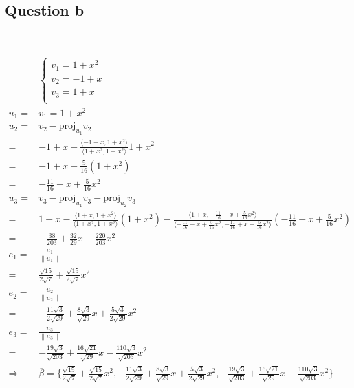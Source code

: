 \documentclass{article}
\def\proj{\text{proj}}
\begin{document}
\subsection{Question b}

~

\begin{equation*}
    \begin{split}
        &\begin{cases}
            v_1=1+x^2\\
            v_2=-1+x\\
            v_3=1+x\\
        \end{cases}\\
        u_1=&v_1=1+x^2\\
        u_2=&v_2-\proj_{u_1}v_2\\
        =&-1+x-\frac{\langle-1+x,1+x^2\rangle}{\langle1+x^2,1+x^2\rangle}1+x^2\\
        =&-1+x+\frac{5}{16}(1+x^2)\\
        =&-\frac{11}{16}+x+\frac{5}{16}x^2\\
        u_3=&v_3-\proj_{u_1}v_3-\proj_{u_2}v_3\\
        =&1+x-\frac{\langle1+x,1+x^2\rangle}{\langle1+x^2,1+x^2\rangle}(1+x^2)-\frac{\langle1+x,-\frac{11}{16}+x+\frac{5}{16}x^2\rangle}{\langle-\frac{11}{16}+x+\frac{5}{16}x^2,-\frac{11}{16}+x+\frac{5}{16}x^2\rangle}(-\frac{11}{16}+x+\frac{5}{16}x^2)\\
        =&-\frac{38}{203}+\frac{32}{29}x-\frac{220}{203}x^2\\
        e_1=&\frac{u_1}{\|u_1\|}\\
        =&\frac{\sqrt{15}}{2\sqrt{7}}+\frac{\sqrt{15}}{2\sqrt{7}}x^2\\
        e_2=&\frac{u_2}{\|u_2\|}\\
        =&-\frac{11\sqrt{3}}{2\sqrt{29}}+\frac{8\sqrt{3}}{\sqrt{29}}x+\frac{5\sqrt{3}}{2\sqrt{29}}x^2\\
        e_3=&\frac{u_3}{\|u_3\|}\\
        =&-\frac{19\sqrt{3}}{\sqrt{203}}+\frac{16\sqrt{21}}{\sqrt{29}}x-\frac{110\sqrt{3}}{\sqrt{203}}x^2\\
        \Rightarrow&\overline{\beta}=\{\frac{\sqrt{15}}{2\sqrt{7}}+\frac{\sqrt{15}}{2\sqrt{7}}x^2,-\frac{11\sqrt{3}}{2\sqrt{29}}+\frac{8\sqrt{3}}{\sqrt{29}}x+\frac{5\sqrt{3}}{2\sqrt{29}}x^2,-\frac{19\sqrt{3}}{\sqrt{203}}+\frac{16\sqrt{21}}{\sqrt{29}}x-\frac{110\sqrt{3}}{\sqrt{203}}x^2\}\\
    \end{split}
\end{equation*}
\end{document}
